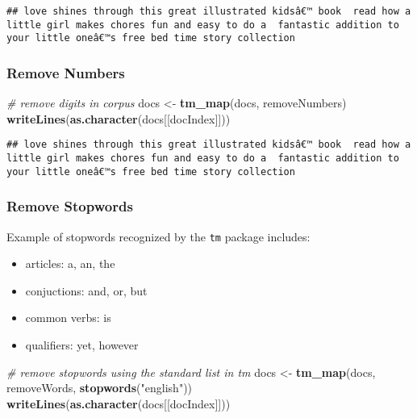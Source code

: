 \documentclass[
]{article}
\newenvironment{Shaded}{\begin{snugshade}}{\end{snugshade}}
\newcommand{\CommentTok}[1]{\textcolor[rgb]{0.56,0.35,0.01}{\textit{#1}}}
\newcommand{\KeywordTok}[1]{\textcolor[rgb]{0.13,0.29,0.53}{\textbf{#1}}}
\newcommand{\NormalTok}[1]{#1}
\newcommand{\StringTok}[1]{\textcolor[rgb]{0.31,0.60,0.02}{#1}}
\providecommand{\tightlist}{%
  \setlength{\itemsep}{0pt}\setlength{\parskip}{0pt}}
\begin{document}
\begin{verbatim}
## love shines through this great illustrated kidsâ€™ book  read how a little girl makes chores fun and easy to do a  fantastic addition to your little oneâ€™s free bed time story collection
\end{verbatim}

\hypertarget{remove-numbers}{%
\subsubsection{Remove Numbers}\label{remove-numbers}}

\begin{Shaded}
\begin{Highlighting}[]
\CommentTok{# remove digits in corpus}
\NormalTok{docs <-}\StringTok{ }\KeywordTok{tm_map}\NormalTok{(docs, removeNumbers)}
\KeywordTok{writeLines}\NormalTok{(}\KeywordTok{as.character}\NormalTok{(docs[[docIndex]]))}
\end{Highlighting}
\end{Shaded}

\begin{verbatim}
## love shines through this great illustrated kidsâ€™ book  read how a little girl makes chores fun and easy to do a  fantastic addition to your little oneâ€™s free bed time story collection
\end{verbatim}

\hypertarget{remove-stopwords}{%
\subsubsection{Remove Stopwords}\label{remove-stopwords}}

Example of stopwords recognized by the \texttt{tm} package includes:

\begin{itemize}
\tightlist
\item
  articles: a, an, the
\item
  conjuctions: and, or, but
\item
  common verbs: is
\item
  qualifiers: yet, however
\end{itemize}

\begin{Shaded}
\begin{Highlighting}[]
\CommentTok{# remove stopwords using the standard list in tm}
\NormalTok{docs <-}\StringTok{ }\KeywordTok{tm_map}\NormalTok{(docs, removeWords, }\KeywordTok{stopwords}\NormalTok{(}\StringTok{"english"}\NormalTok{))}
\KeywordTok{writeLines}\NormalTok{(}\KeywordTok{as.character}\NormalTok{(docs[[docIndex]]))}
\end{Highlighting}
\end{Shaded}
\end{document}
